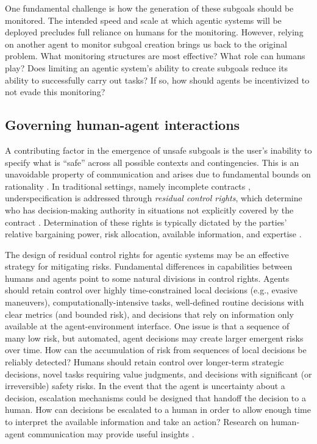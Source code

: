 \documentclass{article}
\theoremstyle{plain}
\theoremstyle{definition}
\theoremstyle{remark}
\begin{document}
One fundamental challenge is how the generation of these subgoals should be monitored. The intended speed and scale at which agentic systems will be deployed precludes full reliance on humans for the monitoring. However, relying on another agent to monitor subgoal creation brings us back to the original problem. What monitoring structures are most effective? What role can humans play? Does limiting an agentic system's ability to create subgoals reduce its ability to successfully carry out tasks? If so, how should agents be incentivized to not evade this monitoring?




\subsection{Governing human-agent interactions}

A contributing factor in the emergence of unsafe subgoals is the user's inability to specify what is ``safe'' across all possible contexts and contingencies. This is an unavoidable property of communication and arises due to fundamental bounds on rationality \cite{simon_1957,williamson1975markets}. In traditional settings, namely incomplete contracts \cite{grossman1986costs,hart1990property}, underspecification is addressed through \emph{residual control rights}, which determine who has decision-making authority in situations not explicitly covered by the contract \cite{hart1990property,hart1995firms}. Determination of these rights is typically dictated by the parties' relative bargaining power, risk allocation, available information, and expertise \cite{aghion1992incomplete,aghion1997formal,baker2002relational}. 


The design of residual control rights for agentic systems may be an effective strategy for mitigating risks. Fundamental differences in capabilities between humans and agents point to some natural divisions in control rights. Agents should retain control over highly time-constrained local decisions (e.g., evasive maneuvers), computationally-intensive tasks, well-defined routine decisions with clear metrics (and bounded risk), and decisions that rely on information only available at the agent-environment interface. One issue is that a sequence of many low risk, but automated, agent decisions may create larger emergent risks over time. How can the accumulation of risk from sequences of local decisions be reliably detected? Humans should retain control over longer-term strategic decisions, novel tasks requiring value judgments, and decisions with significant (or irreversible) safety risks. In the event that the agent is uncertainty about a decision, escalation mechanisms could be designed that handoff the decision to a human. How can decisions be escalated to a human in order to allow enough time to interpret the available information and take an action? Research on human-agent communication may provide useful insights \cite{bansal2024challenges,burton2024large}.
\end{document}
